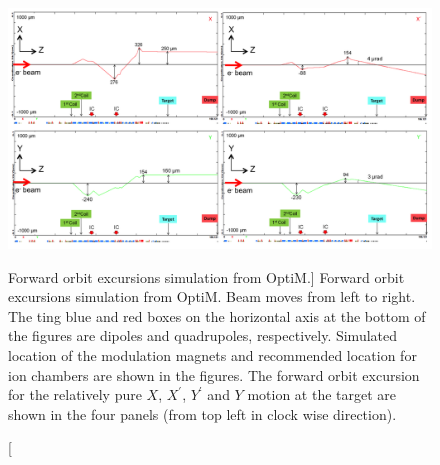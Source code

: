 \begin{singlespace}
\begin{figure}[!h]
	\begin{center}
	\includegraphics[width=15.0cm]{figures/BModForwardBeamline}
	\end{center}
	\caption
	[Forward orbit excursions simulation from OptiM.]	
	{Forward orbit excursions simulation from OptiM. Beam moves from left to right. The ting blue and red boxes on the horizontal axis at the bottom of the figures are dipoles and quadrupoles, respectively. Simulated location of the modulation magnets and recommended location for ion chambers are shown in the figures. The forward orbit excursion for the relatively pure $X$, $X^{\prime}$, $Y^{\prime}$ and $Y$ motion at the target are shown in the four panels (from top left in clock wise direction).}
	\label{fig:BModForwardBeamline}
\end{figure}
\end{singlespace}




